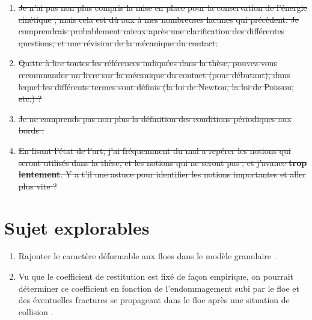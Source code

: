\documentclass[
  french,
	11pt, %
]{fphw}
\begin{document}
\begin{enumerate}
  \item \sout{Je n'ai pas non plus compris la mise en place pour la conservation de l’énergie cinétique ; mais cela est dû aux à mes nombreuses lacunes qui précèdent. Je comprendrais probablement mieux après une clarification des différentes questions, et une révision de la mécanique du contact.}

  \item \sout{Quitte à lire toutes les références indiquées dans la thèse, pouvez-vous recommander un livre sur la mécanique du contact (pour débutant), dans lequel les différents termes sont définis (la loi de Newton, la loi de Poisson, etc.) ?}
  
  \item \sout{Je ne comprends pas non plus la définition des conditions périodiques aux bords \parencite[p.44]{rabatel2015thesis}.}

  \item \sout{En lisant l'état de l'art, j'ai fréquemment du mal a repérer les notions qui seront utilisés dans la thèse, et les notions qui ne seront pas ; et j'avance \textbf{trop lentement}. Y a t'il une astuce pour identifier les notions importantes et aller plus vite ?}
\end{enumerate}






\section{Sujet explorables}

\begin{enumerate}
  \item Rajouter le caractère déformable aux floes dans le modèle granulaire \parencite[p.12]{rabatel2015thesis}.
  \item Vu que le coefficient de restitution est fixé de façon empirique, on pourrait déterminer ce coefficient en fonction de l’endommagement subi par le floe et des éventuelles fractures se propageant dans le floe après une situation de collision \parencite[p.14]{rabatel2015thesis}.
\end{enumerate}

\clearpage   %
\printbibliography
\end{document}
